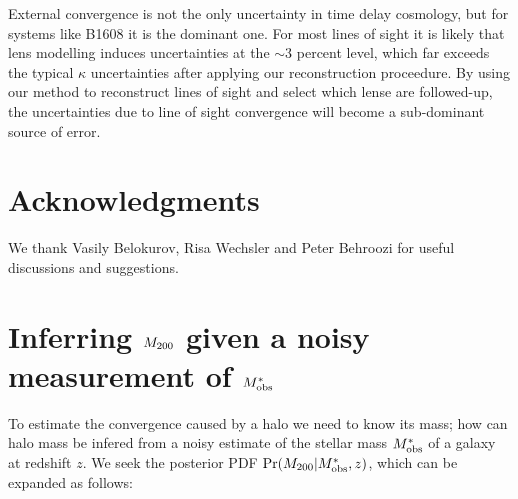 \documentclass[useAMS,usenatbib]{mn2e}
\begin{document}
External convergence is not the only uncertainty in time delay cosmology,
but for systems like B1608 it is the dominant one. For most lines
of sight it is likely that lens modelling induces uncertainties at the
$\sim$3 percent level, which far exceeds the typical $\kappa$ uncertainties
after applying our reconstruction proceedure. By using our method to
reconstruct lines of sight and select which lense are followed-up, the
uncertainties due to line of sight convergence will become a sub-dominant 
source of error.


\section*{Acknowledgments}
 
We thank Vasily Belokurov, Risa Wechsler and Peter Behroozi 
for useful discussions and suggestions.



\appendix


\section{Inferring $M_{200}$ given a noisy measurement of $M^{*}_{\rm obs}$}
\label{appendix:MSMH}

To estimate the convergence caused by a halo we need to know its mass; how can 
halo mass be infered from a noisy estimate of the stellar mass $M^{*}_{\rm obs}$
of a galaxy at redshift $z$. We seek the posterior
PDF $\Pr(M_{200}|M^{*}_{\rm obs},z)$, which can be expanded as follows:
\end{document}
